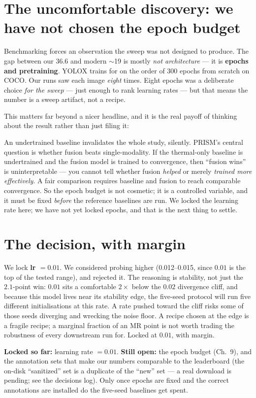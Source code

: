 \documentclass[../main.tex]{subfiles}
\begin{document}
\section{The uncomfortable discovery: we have not chosen the epoch budget}

Benchmarking forces an observation the sweep was not designed to produce. The gap between our
$36.6$ and modern $\sim$19 is mostly \emph{not architecture} --- it is \textbf{epochs and
pretraining}. YOLOX trains for on the order of 300 epochs from scratch on COCO. Our runs saw each
image \emph{eight} times. Eight epochs was a deliberate choice \emph{for the sweep} --- just enough
to rank learning rates --- but that means the number is a sweep artifact, not a recipe.

This matters far beyond a nicer headline, and it is the real payoff of thinking about the result
rather than just filing it:

\begin{lesson}
An undertrained baseline invalidates the whole study, silently. PRISM's central question is whether
fusion beats single-modality. If the thermal-only baseline is undertrained and the fusion model is
trained to convergence, then ``fusion wins'' is uninterpretable --- you cannot tell whether fusion
\emph{helped} or merely \emph{trained more effectively}. A fair comparison requires baseline and
fusion to reach comparable convergence. So the epoch budget is not cosmetic; it is a controlled
variable, and it must be fixed \emph{before} the reference baselines are run. We locked the learning
rate here; we have not yet locked epochs, and that is the next thing to settle.
\end{lesson}

\section{The decision, with margin}

We lock \textbf{lr $=0.01$}. We considered probing higher (0.012--0.015, since $0.01$ is the top of
the tested range), and rejected it. The reasoning is stability, not just the $2.1$-point win:
$0.01$ sits a comfortable $2\times$ below the $0.02$ divergence cliff, and because this model lives
near its stability edge, the five-seed protocol will run five different initialisations at this
rate. A rate pushed toward the cliff risks some of those seeds diverging and wrecking the noise
floor. A recipe chosen at the edge is a fragile recipe; a marginal fraction of an MR point is not
worth trading the robustness of every downstream run for. Locked at $0.01$, with margin.

\medskip\noindent\textbf{Locked so far:} learning rate $=0.01$. \textbf{Still open:} the epoch
budget (Ch.~9), and the annotation sets that make our numbers comparable to the leaderboard (the
on-disk ``sanitized'' set is a duplicate of the ``new'' set --- a real download is pending; see the
decisions log). Only once epochs are fixed and the correct annotations are installed do the
five-seed baselines get spent.
\end{document}
